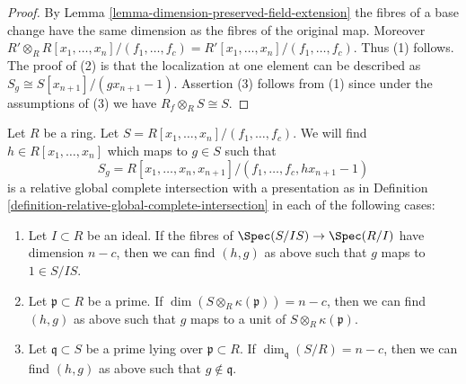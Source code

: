 \begin{proof}
By Lemma \ref{lemma-dimension-preserved-field-extension}
the fibres of a base change have the same dimension as the
fibres of the original map. Moreover
$R' \otimes_R R[x_1, \ldots, x_n]/(f_1, \ldots, f_c)
= R'[x_1, \ldots, x_n]/(f_1, \ldots, f_c)$. Thus (1) follows.
The proof of (2) is that
the localization at one element can be described as
$S_g \cong S[x_{n + 1}]/(gx_{n + 1} - 1)$.
Assertion (3) follows from (1) since under the assumptions of (3) we have
$R_f \otimes_R S \cong S$.
\end{proof}

\begin{lemma}
\label{lemma-localize-relative-complete-intersection}
Let $R$ be a ring. Let $S = R[x_1, \ldots, x_n]/(f_1, \ldots, f_c)$.
We will find $h \in R[x_1, \ldots, x_n]$ which maps to $g \in S$
such that
$$
S_g = R[x_1, \ldots, x_n, x_{n + 1}]/(f_1, \ldots, f_c, hx_{n + 1} - 1)
$$
is a relative global complete intersection with a presentation as in
Definition \ref{definition-relative-global-complete-intersection}
in each of the following cases:
\begin{enumerate}
\item Let $I \subset R$ be an ideal. If the fibres of
$\Spec(S/IS) \to \Spec(R/I)$ have dimension $n - c$, then we can
find $(h, g)$ as above such that $g$ maps to $1 \in S/IS$.
\item Let $\mathfrak p \subset R$ be a prime. If
$\dim(S \otimes_R \kappa(\mathfrak p)) = n - c$, then we can
find $(h, g)$ as above such that $g$ maps to a unit of
$S \otimes_R \kappa(\mathfrak p)$.
\item Let $\mathfrak q \subset S$ be a prime lying over
$\mathfrak p \subset R$. If $\dim_{\mathfrak q}(S/R) = n - c$, then we can
find $(h, g)$ as above such that $g \not \in \mathfrak q$.
\end{enumerate}
\end{lemma}


